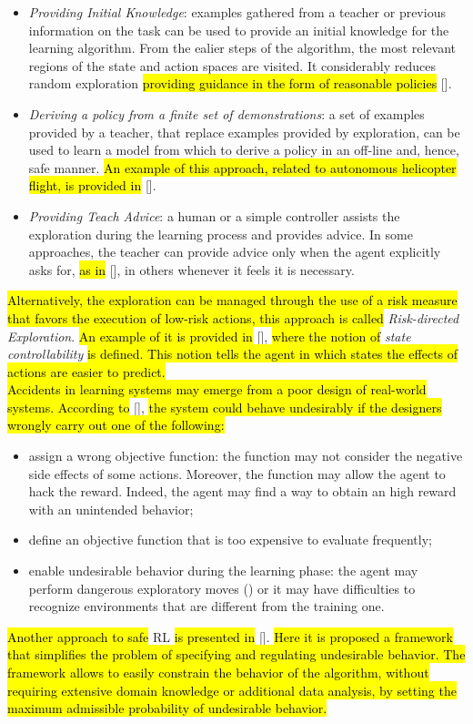 \begin{itemize}
	\item \emph{Providing Initial Knowledge}: examples gathered from a teacher or previous information on the task can be used to provide an initial knowledge for the learning algorithm. From the ealier steps of the algorithm, the most relevant regions of the state and action spaces are visited. It considerably reduces random exploration \hl{providing guidance in the form of reasonable policies} [\cite{driessen2004integrating}].
	\item \emph{Deriving a policy from a finite set of demonstrations}: a set of examples provided by a teacher, that replace examples provided by exploration, can be used to learn a model from which to derive a policy in an off-line and, hence, safe manner. \hl{An example of this approach, related to autonomous helicopter flight, is provided in} [\cite{abbeel2010autonomous}].
	\item \emph{Providing Teach Advice}: a human or a simple controller assists the exploration during the learning process and provides advice. In some approaches, the teacher can provide advice only when the agent explicitly asks for, \hl{as in} [\cite{clouse1997on}], in others whenever it feels it is necessary. 
\end{itemize}
\hl{Alternatively, the exploration can be managed through the use of a risk measure that favors the execution of low-risk actions, this approach is called} \emph{Risk-directed Exploration}. \hl{An example of it is provided in} [\cite{gehring2013smart}], \hl{where the notion of} \emph{state controllability} \hl{is defined. This notion tells the agent in which states the effects of actions are easier to predict.}\\
\newline 
\hl{Accidents in learning systems may emerge from a poor design of real-world systems. According to} [\cite{amodei2016concrete}], \hl{the system could behave undesirably if the designers wrongly carry out one of the following:}
\begin{itemize}
	\item assign a wrong objective function: the function may not consider the negative side effects of some actions. Moreover, the function may allow the agent to hack the reward. Indeed, the agent may find a way to obtain an high reward with an unintended behavior;
	\item define an objective function that is too expensive to evaluate frequently;
	\item enable undesirable behavior during the learning phase: the agent may perform dangerous exploratory moves () or it may have difficulties to recognize environments that are different from the training one. 
\end{itemize}
\hl{Another approach to safe} \ac{RL} \hl{is presented in} [\cite{thomas2019preventing}]. \hl{Here it is proposed a framework that simplifies the problem of specifying and regulating undesirable behavior. The framework allows to easily constrain the behavior of the algorithm, without requiring extensive domain knowledge or additional data analysis, by setting the maximum admissible probability of undesirable behavior.}

